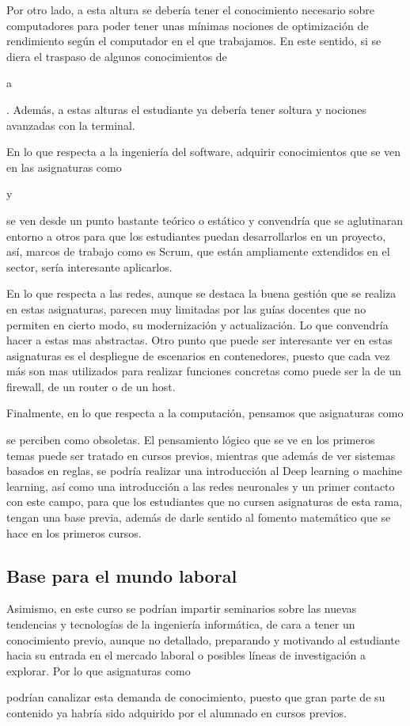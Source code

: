 Por otro lado, a esta altura se debería tener el conocimiento necesario sobre computadores 
para poder tener unas mínimas nociones de optimización de rendimiento según el computador 
en el que trabajamos. En este sentido, si se diera el traspaso de algunos conocimientos de 
\subject{Arquitectura y Organización de Computadores} a \subject{Ampliación de Estructura 
de Computadores}. Además, a estas alturas el estudiante ya debería tener soltura y nociones 
avanzadas con la terminal.

En lo que respecta a la ingeniería del software, adquirir conocimientos que se ven en las 
asignaturas como \subject{Procesos de Desarrollo Software} y \subject{Gestión de Proyectos 
de Desarrollo de Software} se ven desde un punto bastante teórico o estático y convendría 
que se aglutinaran entorno a otros para que los estudiantes puedan desarrollarlos en un 
proyecto, así, marcos de trabajo como es Scrum, que están ampliamente extendidos en el 
sector, sería interesante aplicarlos.

En lo que respecta a las redes, aunque se destaca la buena gestión que se realiza en estas 
asignaturas, parecen muy limitadas por las guías docentes que no permiten en cierto modo, 
su modernización y actualización. Lo que convendría hacer a estas mas abstractas. Otro punto 
que puede ser interesante ver en estas asignaturas es el despliegue de escenarios en 
contenedores, puesto que cada vez más son mas utilizados para realizar funciones concretas 
como puede ser la de un firewall, de un router o de un host.

Finalmente, en lo que respecta a la computación, pensamos que asignaturas como 
\subject{Sistemas inteligentes} se perciben como obsoletas. El pensamiento lógico que se ve 
en los primeros temas puede ser tratado en cursos previos, mientras que además de ver 
sistemas basados en reglas, se podría realizar una introducción al Deep learning o machine 
learning, así como una introducción a las redes neuronales y un primer contacto con este 
campo, para que los estudiantes que no cursen asignaturas de esta rama, tengan una base previa, 
además de darle sentido al fomento matemático que se hace en los primeros cursos.


\subsection{Base para el mundo laboral}
Asimismo, en este curso se podrían impartir seminarios sobre las nuevas tendencias y 
tecnologías de la ingeniería informática, de cara a tener un conocimiento previo, aunque 
no detallado, preparando y motivando al estudiante hacia su entrada en el mercado laboral o 
posibles líneas de investigación a explorar. Por lo que asignaturas como 
\subject{Tecnologías Específicas de la Ingeniería Informática (TEII)} podrían canalizar 
esta demanda de conocimiento, puesto que gran parte de su contenido ya habría sido adquirido 
por el alumnado en cursos previos.

